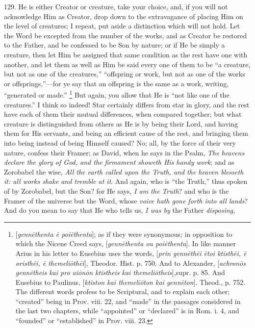129. He is either Creator or
creature, take your choice, and, if you will not acknowledge Him as
Creator, drop down to the extravagance of placing Him on the level of
creatures; I repeat, put aside a distinction which will not hold. Let
the Word be excepted from the number of the works, and as Creator be
restored to the Father, and be confessed to be Son by nature; or if He
be simply a creature, then let Him be assigned that same condition as
the rest have one with another, and let them as well as Him be said
every one of them to be ``a creature, but not as one of the creatures,''
``offspring or work, but not as one of the works or offsprings,''—for
ye say that an offspring is the same as a work, writing, ``generated
or made.'' \footnote{[\emph{genn\={e}thenta \={e} poi\={e}thenta}]; as if they
were synonymous; in opposition to which the Nicene Creed says, [\emph{genn\={e}thenta
ou poi\={e}thenta}]. In like manner Arius in his letter to
Eusebius uses the words, [\emph{prin genn\={e}th\={e}i \={e}toi ktisth\={e}i,
\={e} oristh\={e}i, \={e} themeli\={o}th\={e}i}],
Theodor. Hist. p. 750. And to Alexander, [\emph{achron\={o}s genn\={e}theis
kai pro ai\={o}n\={o}n ktistheis kai themeli\={o}theis}],\emph{}supr. p. 85. And Eusebius to Paulinus, [\emph{ktiston kai themeli\={o}ton
kai genn\={e}ton}]. Theod., p. 752. The different words profess
to be Scriptural, and to explain each other; ``created'' being in Prov.
viii. 22, and ``made'' in the passages considered in the last two
chapters, while ``appointed'' or ``declared'' is in Rom. i. 4, and ``founded''
or ``established'' in Prov. viii. 23.} But again,
you allow that He is ``not like one of the creatures.'' I think so
indeed! Star certainly differs from star in glory, and the rest have
each of them their mutual differences, when compared together; but
what creature is distinguished from others as He is by being their
Lord, and having them for His servants, and being an efficient cause
of the rest, and bringing them into being instead of being Himself
caused? No; all, by the force of their very nature, confess their
Framer; as David, when he says in the Psalm, \emph{The heavens declare
the glory of God, and the firmament showeth His handy work}; and as
Zorobabel the wise, \emph{All the earth called upon the Truth, and the
heaven blesseth it: all works shake and tremble at it}. And again,
who is ``the Truth,'' thus spoken of by Zorobabel, but the Son? for He
says, \emph{I am the Truth}? and who is the Framer of the universe but
the Word, whose \emph{voice hath gone forth into all lands}? And do
you mean to say that He who tells us, \emph{I was by} the Father \emph{disposing},
